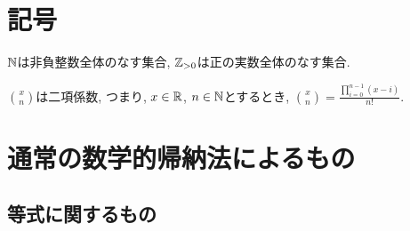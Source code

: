 \section{記号}
$\mathbb{N}$は非負整数全体のなす集合,
$\mathbb{Z}_{>0}$は正の実数全体のなす集合.

$\binom{x}{n}$は二項係数, つまり,
$x\in\mathbb{R}$, $n\in \mathbb{N}$とするとき,
$\binom{x}{n}=\frac{\prod_{i=0}^{n-1}(x-i)}{n!}$.

\section{通常の数学的帰納法によるもの}
\subsection{等式に関するもの}
